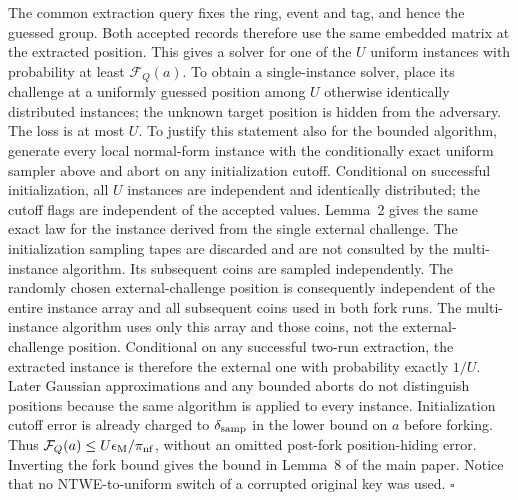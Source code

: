 \documentclass[lettersize,journal]{IEEEtran}
\newenvironment{proof}{{\noindent\it Proof:} }{\hfill $\square$\par}
\begin{document}
\begin{proof}
	The common extraction query fixes the ring, event and tag, and hence the guessed group. Both accepted records therefore use the same embedded matrix at the extracted position. This gives a solver for one of the $U$ uniform instances with probability at least $\mathcal F_Q(a)$. To obtain a single-instance solver, place its challenge at a uniformly guessed position among $U$ otherwise identically distributed instances; the unknown target position is hidden from the adversary. The loss is at most $U$. To justify this statement also for the bounded algorithm, generate every local normal-form instance with the conditionally exact uniform sampler above and abort on any initialization cutoff. Conditional on successful initialization, all $U$ instances are independent and identically distributed; the cutoff flags are independent of the accepted values. Lemma~2 gives the same exact law for the instance derived from the single external challenge. The initialization sampling tapes are discarded and are not consulted by the multi-instance algorithm. Its subsequent coins are sampled independently. The randomly chosen external-challenge position is consequently independent of the entire instance array and all subsequent coins used in both fork runs. The multi-instance algorithm uses only this array and those coins, not the external-challenge position. Conditional on any successful two-run extraction, the extracted instance is therefore the external one with probability exactly $1/U$. Later Gaussian approximations and any bounded aborts do not distinguish positions because the same algorithm is applied to every instance. Initialization cutoff error is already charged to $\delta_{\rm samp}$ in the lower bound on $a$ before forking. Thus $\mathcal F_Q(a)\le U\epsilon_{\rm M}/\pi_{\rm nf}$, without an omitted post-fork position-hiding error. Inverting the fork bound gives the bound in Lemma~8 of the main paper. Notice that no NTWE-to-uniform switch of a corrupted original key was used.
\end{proof}
	
\end{document}
